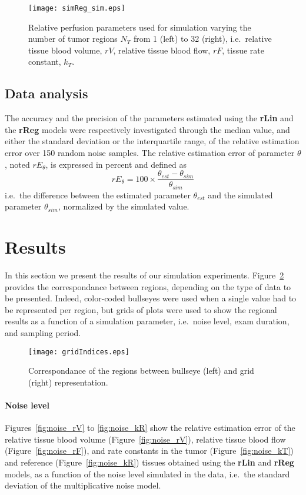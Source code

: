 \begin{figure}
\texttt{[image: simReg\_sim.eps]}
\caption{Relative perfusion parameters used for simulation varying the number of tumor regions $N_T$ from 1 (left) to 32 (right), i.e.~relative tissue blood volume, $rV$, relative tissue blood flow, $rF$, tissue rate constant, $k_T$.}
\label{fig:simReg}
\end{figure}

\subsection{Data analysis}\label{sec:dataAnalysis}
The accuracy and the precision of the parameters estimated using the \textbf{rLin} and the \textbf{rReg} models were respectively investigated through the median value, and either the standard deviation or the interquartile range, of the relative estimation error over 150 random noise samples.
The relative estimation error of parameter $\theta$, noted $rE_{\theta}$, is expressed in percent and defined as
\begin{equation}
rE_{\theta} = 100 \times \frac{\theta_{est}-\theta_{sim}}{\theta_{sim}}
\end{equation}
i.e.~the difference between the estimated parameter $\theta_{est}$ and the simulated parameter $\theta_{sim}$, normalized by the simulated value.

\section{Results}
In this section we present the results of our simulation experiments.
Figure~\ref{fig:gridIndices} provides the correspondance between regions, depending on the type of data to be presented.
Indeed, color-coded bullseyes were used when a single value had to be represented per region, but grids of plots were used to show the regional results as a function of a simulation parameter, i.e.~noise level, exam duration, and sampling period.

\begin{figure}
\texttt{[image: gridIndices.eps]}
\caption{Correspondance of the regions between bullseye (left) and grid (right) representation.}
\label{fig:gridIndices}
\end{figure}

\paragraph{Noise level}
Figures~\ref{fig:noise_rV} to \ref{fig:noise_kR} show the relative estimation error of the relative tissue blood volume (Figure~\ref{fig:noise_rV}), relative tissue blood flow (Figure~\ref{fig:noise_rF}), and rate constants in the tumor (Figure~\ref{fig:noise_kT}) and reference  (Figure~\ref{fig:noise_kR}) tissues obtained using the \textbf{rLin} and \textbf{rReg} models, as a function of the noise level simulated in the data, i.e.~the standard deviation of the multiplicative noise model.

